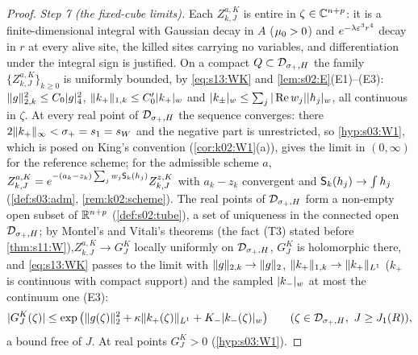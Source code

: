 \begin{proof}
\emph{Step 7 (the fixed-cube limits).} Each $Z^{a,K}_{k,J}$ is entire in $\zeta\in\mathbb C^{n+p}$: it is a finite-dimensional integral with Gaussian decay in $A$ ($\mu_0>0$) and $e^{-\lambda\varepsilon^3r^4}$ decay in $r$ at every alive site, the killed sites carrying no variables, and differentiation under the integral sign is justified. On a compact $Q\subset\mathcal D_{\sigma_+,H}$ the family $\{Z^{a,K}_{k,J}\}_{k\ge0}$ is uniformly bounded, by \eqref{eq:s13:WK} and \cref{lem:s02:E}(E1)--(E3): $\lVert g\rVert_{2,k}^2\le C_0\lvert g\rvert_{4}^2$, $\lVert k_+\rVert_{1,k}\le C_0'\lvert k_+\rvert_{w}$ and $\lvert k_\pm\rvert_{w}\le\sum_j|\operatorname{Re} w_j|\lvert h_j\rvert_{w}$, all continuous in $\zeta$. At every real point of $\mathcal D_{\sigma_+,H}$ the sequence converges: there $2\lVert k_+\rVert_\infty<\sigma_+=s_1=s_W$ and the negative part is unrestricted, so \cref{hyp:s03:W1}, which is posed on King's convention (\cref{cor:k02:W1}(a)), gives the limit in $(0,\infty)$ for the reference scheme; for the admissible scheme $a$, $Z^{a,K}_{k,J}=e^{-(a_k-z_k)\sum_jw_j\mathsf S_k(h_j)}Z^{z,K}_{k,J}$ with $a_k-z_k$ convergent and $\mathsf S_k(h_j)\to\int h_j$ (\cref{def:s03:adm}, \cref{rem:k02:scheme}). The real points of $\mathcal D_{\sigma_+,H}$ form a non-empty open subset of $\mathbb R^{n+p}$ (\cref{def:s02:tube}), a set of uniqueness in the connected open $\mathcal D_{\sigma_+,H}$; by Montel's and Vitali's theorems (the fact (T3) stated before \cref{thm:s11:W}),$Z^{a,K}_{k,J}\to G^K_J$ locally uniformly on $\mathcal D_{\sigma_+,H}$, $G^K_J$ is holomorphic there, and \eqref{eq:s13:WK} passes to the limit with $\lVert g\rVert_{2,k}\to\lVert g\rVert_2$, $\lVert k_+\rVert_{1,k}\to\lVert k_+\rVert_{L^1}$ ($k_+$ is continuous with compact support) and the sampled $\lvert k_-\rvert_{w}$ at most the continuum one (E3):
\begin{equation}\label{eq:s13:WKlim}
|G^K_J(\zeta)|\le\exp\big(\norm{g(\zeta)}_2^2+\kappa\norm{k_+(\zeta)}_{L^1}+K_-\wnorm{k_-(\zeta)}\big)\qquad(\zeta\in\Dtube,\ J\ge J_1(R)),
\end{equation}
a bound free of $J$. At real points $G^K_J>0$ (\cref{hyp:s03:W1}).


\end{proof}
